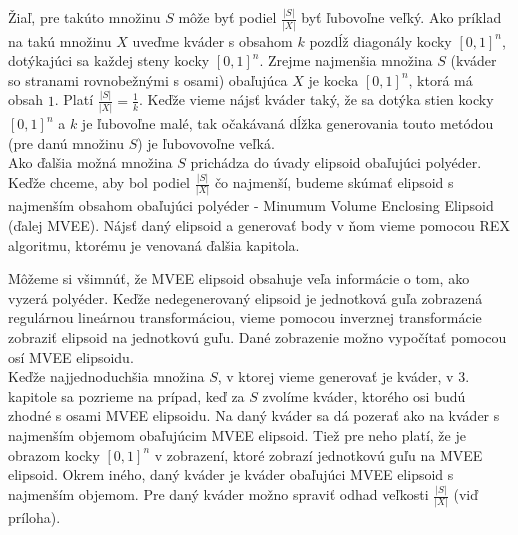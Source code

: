 Žiaľ, pre takúto množinu $S$ môže byť podiel $\frac{|S|}{|X|}$ byť ľubovoľne veľký. Ako príklad na takú množinu $X$ uveďme kváder s obsahom $k$ pozdĺž diagonály kocky $[0,1]^n$, dotýkajúci sa každej steny kocky $[0,1]^n$. Zrejme najmenšia množina $S$ (kváder so stranami rovnobežnými s osami) obaľujúca $X$ je kocka $[0,1]^n$, ktorá má obsah $1$. Platí $\frac{|S|}{|X|}=\frac{1}{k}$. Keďže vieme nájsť kváder taký, že sa dotýka stien kocky $[0,1]^n$ a $k$ je ľubovoľne malé, tak očakávaná dĺžka generovania touto metódou (pre danú množinu $S$) je ľubovovoľne veľká.\\

Ako ďalšia možná množina $S$ prichádza do úvady elipsoid obaľujúci polyéder. Keďže chceme, aby bol podiel $\frac{|S|}{|X|}$ čo najmenší, budeme skúmať elipsoid s najmenším obsahom obaľujúci polyéder - Minumum Volume Enclosing Elipsoid (ďalej MVEE). Nájsť daný elipsoid a generovať body v ňom vieme pomocou REX algoritmu, ktorému je venovaná ďalšia kapitola.

Môžeme si všimnúť, že MVEE elipsoid obsahuje veľa informácie o tom, ako vyzerá polyéder. Keďže nedegenerovaný elipsoid je jednotková guľa zobrazená regulárnou lineárnou transformáciou, vieme pomocou inverznej transformácie zobraziť elipsoid na jednotkovú guľu. Dané zobrazenie možno vypočítať pomocou osí MVEE elipsoidu.\\

Keďže najjednoduchšia množina $S$, v ktorej vieme generovať je kváder, v $3.$ kapitole sa pozrieme na prípad, keď za $S$ zvolíme kváder, ktorého osi budú zhodné s osami MVEE elipsoidu. Na daný kváder sa dá pozerať ako na kváder s najmenším objemom obaľujúcim MVEE elipsoid. Tiež pre neho platí, že je obrazom kocky $[0,1]^n$ v zobrazení, ktoré zobrazí jednotkovú guľu na MVEE elipsoid. Okrem iného, daný kváder je kváder obaľujúci MVEE elipsoid s najmenším objemom. Pre daný kváder možno spraviť odhad veľkosti $\frac{|S|}{|X|}$ (viď príloha).



